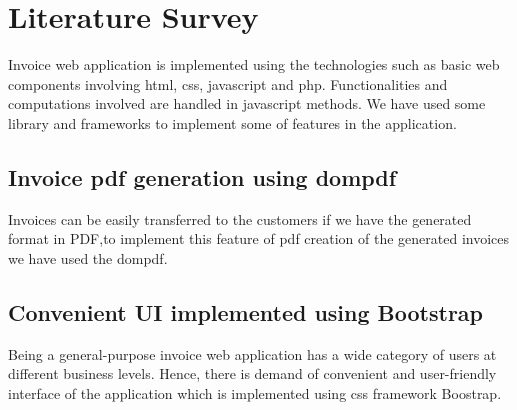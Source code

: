 \chapter{Literature Survey}

Invoice web application is implemented using the technologies such as
basic web components involving html, css, javascript and php\cite{webprogramming}.
Functionalities and computations involved are handled in javascript methods\cite{javascripteloquent}.
We have used some library and frameworks to implement some of features in the application.

\section{Invoice pdf generation using dompdf}
Invoices can be easily transferred to the customers if we have the generated format in PDF,to implement this feature of pdf creation of the generated invoices we have used the dompdf\cite{dompdf}.

\section{Convenient UI implemented using Bootstrap}
Being a general-purpose invoice web application has a wide category of users at different business levels. Hence, there is demand of convenient and user-friendly interface of the application which is implemented using css framework Boostrap\cite{cssbootstrap}.